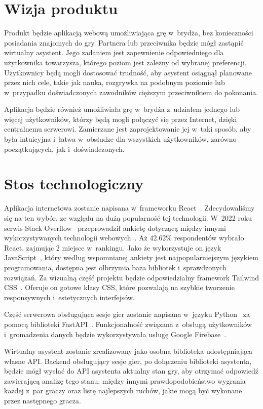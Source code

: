 \section{Wizja produktu}

Produkt będzie aplikacją webową umożliwiająca grę w~brydża,
bez konieczności posiadania znajomych do gry.
Partnera lub przeciwnika będzie mógł zastąpić wirtualny asystent.
Jego zadaniem jest zapewnienie odpowiedniego
dla użytkownika towarzysza, którego poziom jest zależny od wybranej
preferencji. Użytkownicy będą mogli dostosować trudność, aby asystent osiągnął
planowane przez nich cele, takie jak nauka, rozgrywka na podobnym poziomie
lub w~przypadku doświadczonych zawodników cięższym przeciwnikiem do pokonania.

Aplikacja będzie również umożliwiała grę w~brydża z~udziałem jednego lub więcej użytkowników,
którzy będą mogli połączyć się przez Internet, dzięki centralnemu serwerowi.
Zamierzane jest zaprojektowanie jej w~taki sposób, aby była intuicyjna i~łatwa
w~obsłudze dla wszystkich użytkowników, zarówno początkujących, jak
i~doświadczonych.


\section{Stos technologiczny}

Aplikacja internetowa zostanie napisana w~frameworku React~\cite{React}.
Zdecydowaliśmy się na ten wybór, ze względu na dużą popularność tej
technologii. W~2022 roku serwis Stack Overflow~\cite{StackOverflow}
przeprowadził ankietę dotyczącą między innymi wykorzystywanych technologii
webowych~\cite{React-stack}. Aż 42.62\% respondentów wybrało React,
zajmując 2 miejsce w~rankingu. Jako że wykorzystuje on język JavaScript~\cite{JavaScript},
który według wspomnianej ankiety jest najpopularniejszym językiem programowania,
dostępna jest olbrzymia baza bibliotek i~sprawdzonych rozwiązań. Za wizualną
część projektu będzie odpowiedzialny framework Tailwind CSS~\cite{Tailwind}.
Oferuje on gotowe klasy CSS, które pozwalają na szybkie tworzenie responsywnych
i~estetycznych interfejsów.

Część serwerowa obsługująca sesje gier zostanie
napisana w~języku Python~\cite{Python} za pomocą biblioteki
FastAPI~\cite{FastAPI}. Funkcjonalność związana z~obsługą użytkowników
i~gromadzenia
danych będzie wykorzystywała usługę Google Firebase~\cite{Firebase}.

Wirtualny asystent zostanie zrealizowany jako osobna biblioteka udostępniająca
własne API. Backend obsługujący sesje gier, po dołączeniu biblioteki asystenta,
będzie mógł wysłać do API asystenta aktualny stan gry, aby otrzymać
odpowiedź zawierającą analizę tego stanu, między innymi
prawdopodobieństwo wygrania każdej z~par graczy oraz listę
najlepszych ruchów, jakie mogą być wykonane przez następnego gracza.

